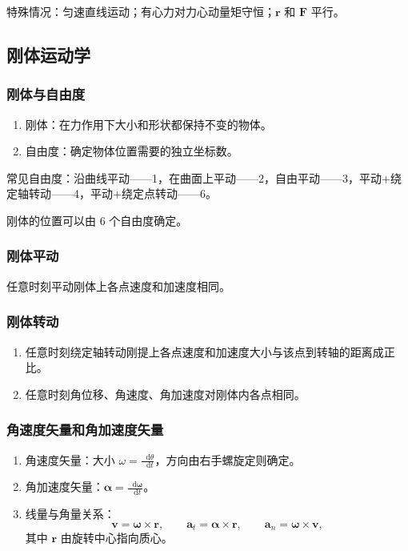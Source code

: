 \documentclass[UTF8,fontset=fandol,zihao=5]{ctexart}
\newcommand{\vect}[1]{\bm{#1}}
\newcommand{\dif}{\mathop{}\!\mathrm{d}}
\begin{document}
特殊情况：匀速直线运动；有心力对力心动量矩守恒；\(\vect r\) 和 \(\vect F\) 平行。

\subsection{刚体运动学}

\subsubsection{刚体与自由度}

\begin{enumerate}
  \item 刚体：在力作用下大小和形状都保持不变的物体。
  \item 自由度：确定物体位置需要的独立坐标数。
\end{enumerate}

常见自由度：沿曲线平动——1，在曲面上平动——2，自由平动——3，平动+绕定轴转动——4，平动+绕定点转动——6。

刚体的位置可以由 6 个自由度确定。

\subsubsection{刚体平动}

任意时刻平动刚体上各点速度和加速度相同。

\subsubsection{刚体转动}

\begin{enumerate}
  \item 任意时刻绕定轴转动刚提上各点速度和加速度大小与该点到转轴的距离成正比。
  \item 任意时刻角位移、角速度、角加速度对刚体内各点相同。
\end{enumerate}

\subsubsection{角速度矢量和角加速度矢量}

\begin{enumerate}
  \item 角速度矢量：大小 \(\displaystyle\omega=\frac{\dif\theta}{\dif t}\)，方向由右手螺旋定则确定。
  \item 角加速度矢量：\(\displaystyle\vect\alpha=\frac{\dif\vect\omega}{\dif t}\)。
  \item 线量与角量关系：
  \[
    \vect v=\vect\omega\times\vect r,
    \qquad
    \vect a_t=\vect\alpha\times\vect r,
    \qquad
    \vect a_n=\vect\omega\times\vect v,
  \]
  其中 \(\vect r\) 由旋转中心指向质心。
\end{enumerate}
\end{document}
